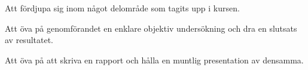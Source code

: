 \item Att fördjupa sig inom något delområde som tagits upp i kursen.
\item Att öva på genomförandet en enklare objektiv undersökning och dra en 
slutsats av resultatet.
\item Att öva på att skriva en rapport och hålla en muntlig presentation av 
densamma.
